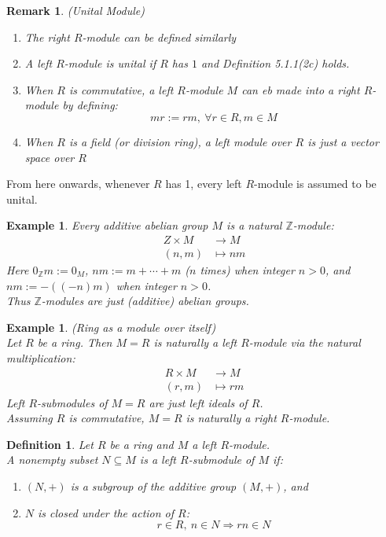 \documentclass[a4paper,8pt]{article}
\newcommand{\Z}{\mathbb{Z}}
\newcommand{\hlt}[1]{\textit{{\color{blue}#1}}}
\theoremstyle{theorem}
\newtheorem{definition}[theorem]{Definition}
\newtheorem{example}[theorem]{Example}
\newtheorem{remark}[theorem]{Remark}
\begin{document}
\begin{remark}
\hlt{(Unital Module)}
\begin{enumerate}[label=(\roman*)]
\item The right $R$-module can be defined similarly
\item A left $R$-module is \hlt{unital} if $R$ has $1$ and Definition 5.1.1(2c) holds.
\item When $R$ is commutative, a left $R$-module $M$ can eb made into a right $R$-module by defining:
\begin{equation}
mr := rm, \ \forall r \in R, m \in M \nonumber
\end{equation} 
\item When $R$ is a field (or division ring), a left module over $R$ is just a vector space over $R$
\end{enumerate}
\end{remark}

From here onwards, whenever $R$ has 1, every left $R$-module is assumed to be unital.

\begin{example}
Every additive abelian group $M$ is a natural $\Z$-module:
\begin{align}
Z \times M &\rightarrow M \nonumber \\
(n,m) &\mapsto nm \nonumber
\end{align}
Here $0_\Z m := 0_M$, $nm := m + \cdots + m$ ($n$ times) when integer $n > 0$, and $nm := -((-n)m)$ when integer $n >0$. \\
Thus $\Z$-modules are just (additive) abelian groups.
\end{example}

\begin{example}
\hlt{(Ring as a module over itself)}\\
Let $R$ be a ring. Then $M=R$ is naturally a left $R$-module via the natural multiplication:
\begin{align}
R \times M &\rightarrow M \nonumber \\
(r,m) &\mapsto rm \nonumber
\end{align}
Left $R$-submodules of $M=R$ are just left ideals of $R$.\\
Assuming $R$ is commutative, $M=R$ is naturally a right $R$-module.
\end{example}

\begin{definition}
Let $R$ be a ring and $M$ a left $R$-module.\\
A nonempty subset $N \subseteq M$ is a \hlt{left $R$-submodule of $M$} if:
\begin{enumerate}[label=(\roman*)]
\item $(N, +)$ is a subgroup of the additive group $(M, +)$, and
\item $N$ is closed under the action of $R$:
\begin{equation}
r \in R,\ n \in N \Rightarrow rn \in N \nonumber
\end{equation}
\end{enumerate}
\end{definition}
\end{document}
